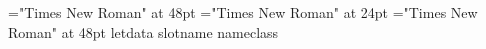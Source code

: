 \font\nameletData="Times New Roman" at 48pt
\font\slotnameletData="Times New Roman" at 24pt
\font{}="Times New Roman" at 48pt
 letdata 
\slotnameletData slotname \nameletData nameclass 

\bye
